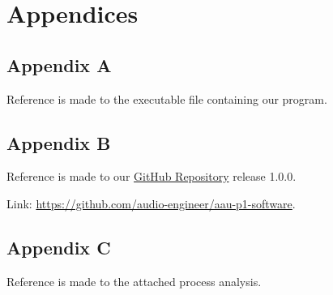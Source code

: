 \chapter*{Appendices}

\section*{Appendix A}\label{sec:appendix-a}

Reference is made to the executable file containing our program.

\section*{Appendix B}\label{sec:appendix-b}

Reference is made to our \href{https://github.com/audio-engineer/aau-p1-software}{GitHub Repository} release 1.0.0.

Link: \url{https://github.com/audio-engineer/aau-p1-software}.

\section*{Appendix C}\label{sec:appendix-c}

Reference is made to the attached process analysis.
